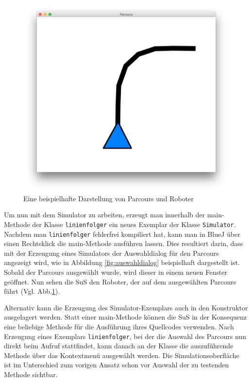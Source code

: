 \documentclass[paper=a4, DIV=calc, BCOR=12mm, twoside=on, onecolumn=on, open = right, titlepage =on, parskip =half-, headsepline = on, footsepline = off, chapterprefix = off, appendixprefix = on, fontsize = 12pt, numbers = noenddot, abstract = on]{scrbook}
\begin{document}
\begin{figure}[tb]
\centering
\includegraphics[width=\textwidth]{images/simparcours_kurve.png} 
\caption{Eine beispielhafte Darstellung von Parcours und Roboter}
\label{fig:simparcours_kurve}
\end{figure}

Um nun mit dem Simulator zu arbeiten, erzeugt man innerhalb der main-Methode der Klasse \texttt{linienfolger} ein neues Exemplar der Klasse \texttt{Si\-mu\-la\-tor}. Nachdem man \texttt{linienfolger} fehlerfrei kompiliert hat, kann man in BlueJ über einen Rechtsklick die main-Me\-tho\-de ausführen lassen. Dies resultiert darin, dass mit der Erzeugung eines Simulators der Auswahldialog für den Parcours angezeigt wird, wie in Abbildung \ref{fig:auswahldialog} beispielhaft dargestellt ist.
Sobald der Parcours ausgewählt wurde, wird dieser in einem neuen Fenster geöffnet. Nun sehen die SuS den Roboter, der auf dem ausgewählten Parcours fährt (Vgl. Abb.\ref{fig:simparcours_kurve}).

Alternativ kann die Erzeugung des Simulator-Exemplars auch in den Konstruktor ausgelagert werden. Statt einer main-Methode können die SuS in der Konsequenz eine beliebige Methode für die Ausführung ihres Quellcodes verwenden. Nach Erzeugung eines Exemplars \texttt{linienfolger}, bei der die Auswahl des Parcours nun direkt beim Aufruf stattfindet, kann danach an der Klasse die auszuführende Methode über das Kontextmenü ausgewählt werden. Die Simulationsoberfläche ist im Unterschied zum vorigen Ansatz schon vor Auswahl der zu testenden Methode sichtbar. 
\end{document}
